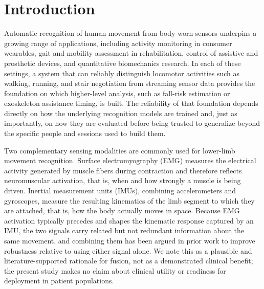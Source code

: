 \documentclass[conference]{IEEEtran}
\begin{document}
\section{Introduction}
\label{sec:introduction}

Automatic recognition of human movement from body-worn sensors
underpins a growing range of applications, including activity
monitoring in consumer wearables, gait and mobility assessment in
rehabilitation, control of assistive and prosthetic devices, and
quantitative biomechanics research. In each of these settings, a
system that can reliably distinguish locomotor activities such as
walking, running, and stair negotiation from streaming sensor data
provides the foundation on which higher-level analysis, such as
fall-risk estimation or exoskeleton assistance timing, is built.
The reliability of that foundation depends directly on how the
underlying recognition models are trained and, just as importantly,
on how they are evaluated before being trusted to generalize beyond
the specific people and sessions used to build them.

Two complementary sensing modalities are commonly used for
lower-limb movement recognition. Surface electromyography (EMG)
measures the electrical activity generated by muscle fibers during
contraction and therefore reflects neuromuscular activation, that
is, when and how strongly a muscle is being driven. Inertial
measurement units (IMUs), combining accelerometers and gyroscopes,
measure the resulting kinematics of the limb segment to which they
are attached, that is, how the body actually moves in space. Because
EMG activation typically precedes and shapes the kinematic response
captured by an IMU, the two signals carry related but not redundant
information about the same movement, and combining them has been
argued in prior work to improve robustness relative to using either
signal alone. We note this as a plausible and literature-supported
rationale for fusion, not as a demonstrated clinical benefit; the
present study makes no claim about clinical utility or readiness for
deployment in patient populations.
\end{document}
